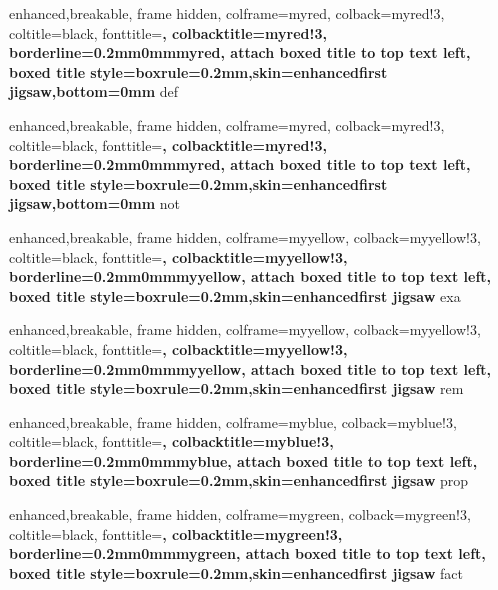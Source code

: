 \newcommand{\exe}{\inlinebox[myred]{exercise}}
\newcommand{\exes}{\inlinebox[myred]{exercises}}

\newcommand{\todo}{\inlinebox[mygray]{TODO}}
\newcommand{\source}{\inlinebox[mygray]{src?}}

{
	enhanced,breakable,
	frame hidden,
	colframe=myred,
	colback=myred!3,
	coltitle=black,
	fonttitle=\bfseries,
	colbacktitle=myred!3,
	borderline={0.2mm}{0mm}{myred},
	attach boxed title to top text left,
	boxed title style={boxrule=0.2mm,skin=enhancedfirst jigsaw,bottom=0mm}
}
{def}

{
	enhanced,breakable,
	frame hidden,
	colframe=myred,
	colback=myred!3,
	coltitle=black,
	fonttitle=\bfseries,
	colbacktitle=myred!3,
	borderline={0.2mm}{0mm}{myred},
	attach boxed title to top text left,
	boxed title style={boxrule=0.2mm,skin=enhancedfirst jigsaw,bottom=0mm}
}
{not}

{
	enhanced,breakable,
	frame hidden,
	colframe=myyellow,
	colback=myyellow!3,
	coltitle=black,
	fonttitle=\bfseries,
	colbacktitle=myyellow!3,
	borderline={0.2mm}{0mm}{myyellow},
	attach boxed title to top text left,
	boxed title style={boxrule=0.2mm,skin=enhancedfirst jigsaw}
}
{exa}

{
	enhanced,breakable,
	frame hidden,
	colframe=myyellow,
	colback=myyellow!3,
	coltitle=black,
	fonttitle=\bfseries,
	colbacktitle=myyellow!3,
	borderline={0.2mm}{0mm}{myyellow},
	attach boxed title to top text left,
	boxed title style={boxrule=0.2mm,skin=enhancedfirst jigsaw}
}
{rem}

{
	enhanced,breakable,
	frame hidden,
	colframe=myblue,
	colback=myblue!3,
	coltitle=black,
	fonttitle=\bfseries,
	colbacktitle=myblue!3,
	borderline={0.2mm}{0mm}{myblue},
	attach boxed title to top text left,
	boxed title style={boxrule=0.2mm,skin=enhancedfirst jigsaw}
}
{prop}

{
	enhanced,breakable,
	frame hidden,
	colframe=mygreen,
	colback=mygreen!3,
	coltitle=black,
	fonttitle=\bfseries,
	colbacktitle=mygreen!3,
	borderline={0.2mm}{0mm}{mygreen},
	attach boxed title to top text left,
	boxed title style={boxrule=0.2mm,skin=enhancedfirst jigsaw}
}
{fact}

